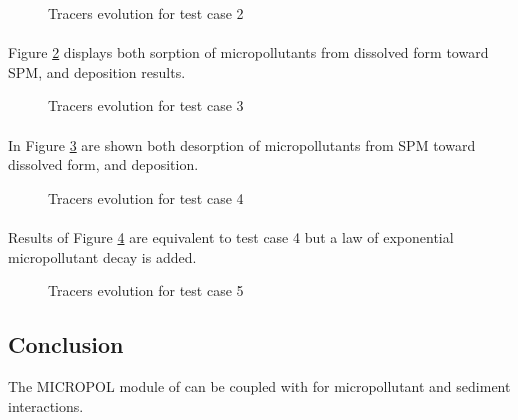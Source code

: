 \begin{figure} [H]
\centering
{}
 \caption{Tracers evolution for test case 2}
 \label{fig:waq3d_micropol:kin2_sed}
\end{figure}

\paragraph{}
Figure \ref{fig:waq3d_micropol:kin2_sorp_desorp} displays both sorption of micropollutants
from dissolved form toward SPM, and deposition results.

\begin{figure} [H]
\centering
{}
\caption{Tracers evolution for test case 3}
 \label{fig:waq3d_micropol:kin2_sorp_desorp}
\end{figure}

\paragraph{}
In Figure \ref{fig:waq3d_micropol:kin2_sed_desorp} are shown both desorption
of micropollutants from SPM toward dissolved form, and deposition.

\begin{figure} [H]
\centering
{}
 \caption{Tracers evolution for test case 4}
 \label{fig:waq3d_micropol:kin2_sed_desorp}
\end{figure}

\paragraph{}
Results of Figure \ref{fig:waq2d_micropol:kin2_sed_desorp_decay} are equivalent to test
case 4 but a law of exponential micropollutant decay is added.

\begin{figure} [H]
\centering
{}
 \caption{Tracers evolution for test case 5}
 \label{fig:waq2d_micropol:kin2_sed_desorp_decay}
\end{figure}

\subsection{Conclusion}

The MICROPOL module of \waqtel can be coupled with  for micropollutant and sediment interactions.
